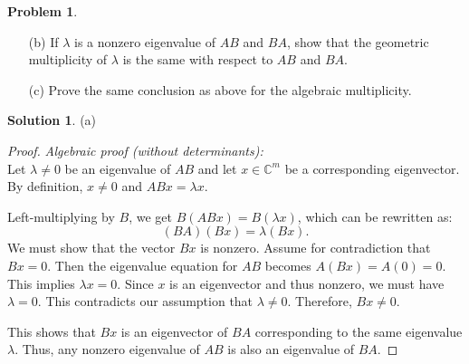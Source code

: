 \documentclass[12pt]{article}
\theoremstyle{definition}
\newtheorem*{solution}{\normalfont\textbf{Solution}}
\newtheorem*{Problem}{\noindent\textbf{Problem}}
\begin{document}
\begin{enumerate}[leftmargin=*]
\begin{Problem}
\begin{enumerate}
                Optional Requirements:
                \begin{itemize}
                    \item Give a proof without using determinants or matrix decomposition.
                    \item Give a proof from a geometric point of view.
                    \item Give a proof from an algebraic point of view.
                \end{itemize}
                \item[(b)] If \( \lambda \) is a nonzero eigenvalue of \( AB \) and \( BA \), show that the geometric multiplicity of \( \lambda \) is the same with respect to \( AB \) and \( BA \).
                \item[(c)] Prove the same conclusion as above for the algebraic multiplicity.
        \end{enumerate}
        \end{Problem}
        \begin{solution}
        \item[(a)]
            \begin{proof}
                \textit{Algebraic proof (without determinants):} \\
                Let \(\lambda \neq 0\) be an eigenvalue of \(AB\) and let \(x \in \mathbb{C}^m\) be a corresponding eigenvector. By definition, \(x \neq 0\) and \(ABx = \lambda x\).
                
                Left-multiplying by \(B\), we get \(B(ABx) = B(\lambda x)\), which can be rewritten as:
                \[
                    (BA)(Bx) = \lambda(Bx).
                \]
                We must show that the vector \(Bx\) is nonzero. Assume for contradiction that \(Bx = 0\). Then the eigenvalue equation for \(AB\) becomes \(A(Bx) = A(0) = 0\). This implies \(\lambda x = 0\). Since \(x\) is an eigenvector and thus nonzero, we must have \(\lambda = 0\). This contradicts our assumption that \(\lambda \neq 0\). Therefore, \(Bx \neq 0\).
                
                This shows that \(Bx\) is an eigenvector of \(BA\) corresponding to the same eigenvalue \(\lambda\). Thus, any nonzero eigenvalue of \(AB\) is also an eigenvalue of \(BA\).
                

\end{proof}
\end{solution}
\end{enumerate}
\end{document}
